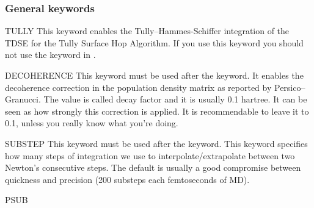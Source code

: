 \subsubsection{General keywords}
\begin{keywordlist}
\item[TULLY]
This keyword enables the Tully--Hammes-Schiffer integration of the TDSE for the Tully Surface Hop Algorithm. If you use this keyword you should not use the  keyword in .
\item[DECOHERENCE]
This keyword must be used after the  keyword. It enables the decoherence correction in the population density matrix as reported by Persico--Granucci. The value is called decay factor and it is usually 0.1 hartree. It can be seen as how strongly this correction is applied. It is recommendable to leave it to 0.1, unless you really know what you're doing.
\item[SUBSTEP]
This keyword must be used after the  keyword. This keyword specifies how many steps of integration we use to interpolate/extrapolate between two Newton's consecutive steps. The default is usually a good compromise between quickness and precision (200 substeps each femtoseconds of MD).
\item[PSUB]

\end{keywordlist}
